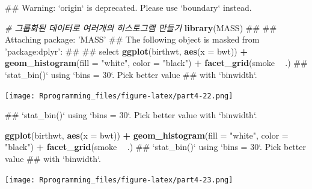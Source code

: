 \documentclass[10pt,]{krantz}
\makeatletter
\newenvironment{Shaded}{\begin{snugshade}}{\end{snugshade}}
\newcommand{\KeywordTok}[1]{\textcolor[rgb]{0.13,0.29,0.53}{\textbf{#1}}}
\newcommand{\DataTypeTok}[1]{\textcolor[rgb]{0.13,0.29,0.53}{#1}}
\newcommand{\StringTok}[1]{\textcolor[rgb]{0.31,0.60,0.02}{#1}}
\newcommand{\CommentTok}[1]{\textcolor[rgb]{0.56,0.35,0.01}{\textit{#1}}}
\newcommand{\OperatorTok}[1]{\textcolor[rgb]{0.81,0.36,0.00}{\textbf{#1}}}
\newcommand{\NormalTok}[1]{#1}
\newenvironment{kframe}{%
\medskip{}
\setlength{\fboxsep}{.8em}
 \def\at@end@of@kframe{}%
 \ifinner\ifhmode%
  \def\at@end@of@kframe{\end{minipage}}%
  \begin{minipage}{\columnwidth}%
 \fi\fi%
 \def\FrameCommand##1{\hskip\@totalleftmargin \hskip-\fboxsep
 \colorbox{shadecolor}{##1}\hskip-\fboxsep
     \hskip-\linewidth \hskip-\@totalleftmargin \hskip\columnwidth}%
 \MakeFramed {\advance\hsize-\width
   \@totalleftmargin\z@ \linewidth\hsize
   \@setminipage}}%
 {\par\unskip\endMakeFramed%
 \at@end@of@kframe}
\renewenvironment{Shaded}{\begin{kframe}}{\end{kframe}}
\theoremstyle{definition}
\theoremstyle{definition}
\theoremstyle{remark}
\makeatother
\begin{document}
\begin{Shaded}
\begin{Highlighting}[]
\NormalTok{## Warning: `origin` is deprecated. Please use `boundary` instead.}


\CommentTok{# 그룹화된 데이터로 여러개의 히스토그램 만들기}
\KeywordTok{library}\NormalTok{(MASS)}
\NormalTok{## }
\NormalTok{## Attaching package: 'MASS'}
\NormalTok{## The following object is masked from 'package:dplyr':}
\NormalTok{## }
\NormalTok{##     select}
\KeywordTok{ggplot}\NormalTok{(birthwt, }\KeywordTok{aes}\NormalTok{(}\DataTypeTok{x =}\NormalTok{ bwt)) }\OperatorTok{+}\StringTok{ }\KeywordTok{geom_histogram}\NormalTok{(}\DataTypeTok{fill =} \StringTok{"white"}\NormalTok{, }\DataTypeTok{color =} \StringTok{"black"}\NormalTok{) }\OperatorTok{+}\StringTok{ }\KeywordTok{facet_grid}\NormalTok{(smoke }\OperatorTok{~}\StringTok{ }\NormalTok{.)}
\NormalTok{## `stat_bin()` using `bins = 30`. Pick better value}
\NormalTok{## with `binwidth`.}
\end{Highlighting}
\end{Shaded}

\texttt{[image: Rprogramming\_files/figure-latex/part4-22.png]}

\begin{Shaded}
\begin{Highlighting}[]
\NormalTok{## `stat_bin()` using `bins = 30`. Pick better value with `binwidth`.}


\KeywordTok{ggplot}\NormalTok{(birthwt, }\KeywordTok{aes}\NormalTok{(}\DataTypeTok{x =}\NormalTok{ bwt)) }\OperatorTok{+}\StringTok{ }\KeywordTok{geom_histogram}\NormalTok{(}\DataTypeTok{fill =} \StringTok{"white"}\NormalTok{, }\DataTypeTok{color =} \StringTok{"black"}\NormalTok{) }\OperatorTok{+}\StringTok{ }\KeywordTok{facet_grid}\NormalTok{(smoke }\OperatorTok{~}\StringTok{ }\NormalTok{.)}
\NormalTok{## `stat_bin()` using `bins = 30`. Pick better value}
\NormalTok{## with `binwidth`.}
\end{Highlighting}
\end{Shaded}

\texttt{[image: Rprogramming\_files/figure-latex/part4-23.png]}
\end{document}

